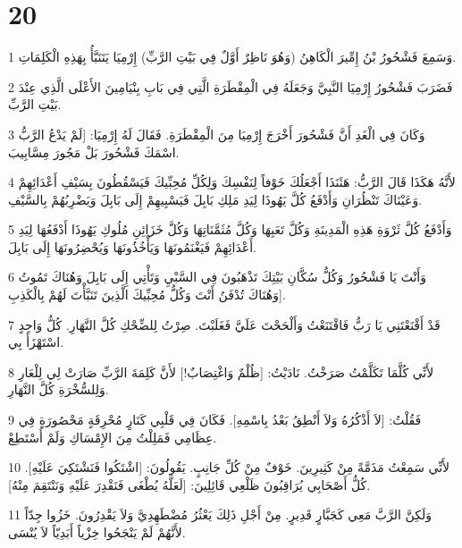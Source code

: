\chapter{20}

\par 1 وَسَمِعَ فَشْحُورُ بْنُ إِمِّيرَ الْكَاهِنُ (وَهُوَ نَاظِرٌ أَوَّلٌ فِي بَيْتِ الرَّبِّ) إِرْمِيَا يَتَنَبَّأُ بِهَذِهِ الْكَلِمَاتِ.
\par 2 فَضَرَبَ فَشْحُورُ إِرْمِيَا النَّبِيَّ وَجَعَلَهُ فِي الْمِقْطَرَةِ الَّتِي فِي بَابِ بِنْيَامِينَ الأَعْلَى الَّذِي عِنْدَ بَيْتِ الرَّبِّ.
\par 3 وَكَانَ فِي الْغَدِ أَنَّ فَشْحُورَ أَخْرَجَ إِرْمِيَا مِنَ الْمِقْطَرَةِ. فَقَالَ لَهُ إِرْمِيَا: [لَمْ يَدْعُ الرَّبُّ اسْمَكَ فَشْحُورَ بَلْ مَجُورَ مِسَّابِيبَ.
\par 4 لأَنَّهُ هَكَذَا قَالَ الرَّبُّ: هَئَنَذَا أَجْعَلُكَ خَوْفاً لِنَفْسِكَ وَلِكُلِّ مُحِبِّيكَ فَيَسْقُطُونَ بِسَيْفِ أَعْدَائِهِمْ وَعَيْنَاكَ تَنْظُرَانِ وَأَدْفَعُ كُلَّ يَهُوذَا لِيَدِ مَلِكِ بَابِلَ فَيَسْبِيهِمْ إِلَى بَابِلَ وَيَضْرِبُهُمْ بِالسَّيْفِ.
\par 5 وَأَدْفَعُ كُلَّ ثَرْوَةِ هَذِهِ الْمَدِينَةِ وَكُلَّ تَعَبِهَا وَكُلَّ مُثَمَّنَاتِهَا وَكُلَّ خَزَائِنِ مُلُوكِ يَهُوذَا أَدْفَعُهَا لِيَدِ أَعْدَائِهِمْ فَيَغْنَمُونَهَا وَيَأْخُذُونَهَا وَيُحْضِرُونَهَا إِلَى بَابِلَ.
\par 6 وَأَنْتَ يَا فَشْحُورُ وَكُلُّ سُكَّانِ بَيْتِكَ تَذْهَبُونَ فِي السَّبْيِ وَتَأْتِي إِلَى بَابِلَ وَهُنَاكَ تَمُوتُ وَهُنَاكَ تُدْفَنُ أَنْتَ وَكُلُّ مُحِبِّيكَ الَّذِينَ تَنَبَّأْتَ لَهُمْ بِالْكَذِبِ].
\par 7 قَدْ أَقْنَعْتَنِي يَا رَبُّ فَاقْتَنَعْتُ وَأَلْحَحْتَ عَلَيَّ فَغَلَبْتَ. صِرْتُ لِلضِّحْكِ كُلَّ النَّهَارِ. كُلُّ وَاحِدٍ اسْتَهْزَأَ بِي.
\par 8 لأَنِّي كُلَّمَا تَكَلَّمْتُ صَرَخْتُ. نَادَيْتُ: [ظُلْمٌ وَاغْتِصَابٌ!] لأَنَّ كَلِمَةَ الرَّبِّ صَارَتْ لِي لِلْعَارِ وَلِلسُّخْرَةِ كُلَّ النَّهَارِ.
\par 9 فَقُلْتُ: [لاَ أَذْكُرُهُ وَلاَ أَنْطِقُ بَعْدُ بِاسْمِهِ]. فَكَانَ فِي قَلْبِي كَنَارٍ مُحْرِقَةٍ مَحْصُورَةٍ فِي عِظَامِي فَمَلِلْتُ مِنَ الإِمْسَاكِ وَلَمْ أَسْتَطِعْ.
\par 10 لأَنِّي سَمِعْتُ مَذَمَّةً مِنْ كَثِيرِينَ. خَوْفٌ مِنْ كُلِّ جَانِبٍ. يَقُولُونَ: [اشْتَكُوا فَنَشْتَكِيَ عَلَيْهِ]. كُلُّ أَصْحَابِي يُرَاقِبُونَ ظَلْعِي قَائِلِينَ: [لَعَلَّهُ يُطْغَى فَنَقْدِرَ عَلَيْهِ وَنَنْتَقِمَ مِنْهُ].
\par 11 وَلَكِنَّ الرَّبَّ مَعِي كَجَبَّارٍ قَدِيرٍ. مِنْ أَجْلِ ذَلِكَ يَعْثُرُ مُضْطَهِدِيَّ وَلاَ يَقْدِرُونَ. خَزُوا جِدّاً لأَنَّهُمْ لَمْ يَنْجَحُوا خِزْياً أَبَدِيّاً لاَ يُنْسَى.
